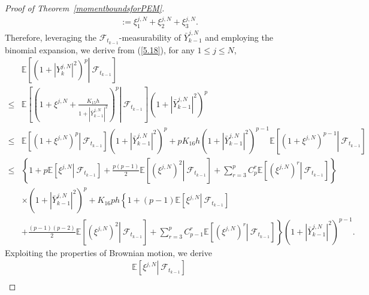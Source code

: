 \documentclass[12pt]{article}
\numberwithin{equation}{section}
\begin{document}
\begin{proof}[Proof of Theorem~\ref{momentboundsforPEM}]
\begin{equation}
\begin{aligned}
&:=\xi^{j,N}_1+\xi^{j,N}_2+\xi^{j,N}_3.
\end{aligned}
\end{equation}
Therefore, leveraging the $\mathcal{F}_{t_{k-1}}$-measurability of $\bar{Y}_{k-1}^{j,N}$ and employing the binomial expansion, we derive from (\ref{5.18}), for any $1 \leq j \leq N$,\\
\begin{equation}\tag{5.67}\label{5.20}
\begin{aligned}
&\mathbb{E} \left[\left. \left( 1+\left| Y_{k}^{j,N} \right|^2 \right) ^p\right\rvert\ \mathcal{F} _{t_{k-1}} \right]\\
\le &\mathbb{E} \left[\left. \left(1+\xi ^{j,N}+\tfrac{K_{15}h}{1+\left| \bar{Y}_{k-1}^{j,N} \right|^2}\right)^p\right\rvert\ \mathcal{F} _{t_{k-1}} \right] \left( 1+\left| \bar{Y}_{k-1}^{j,N} \right|^2 \right) ^p
\\
\le &\mathbb{E} \left[\left. \left(1+\xi ^{j,N}\right)^p\right\rvert\ \mathcal{F} _{t_{k-1}} \right] \left( 1+\left| \bar{Y}_{k-1}^{j,N} \right|^2 \right) ^p+pK_{16}h\left( 1+\left| \bar{Y}_{k-1}^{j,N} \right|^2 \right) ^{p-1}\mathbb{E}\left[\left. \left(1+\xi ^{j,N}\right)^{p-1}\right\rvert\ \mathcal{F} _{t_{k-1}} \right] 
\\
\le &\left\{1+p\mathbb{E}\left[\left. \xi^{j,N} \right\rvert\ \mathcal{F}_{t_{k-1}}\right]+\tfrac{p\left(p-1\right)}{2}\mathbb{E}\left[\left.\left(\xi^{j,N}\right)^2\right\rvert\ \mathcal{F}_{t_{k-1}}\right]+\sum_{r=3}^p{C_{p}^{r}\mathbb{E}\left[\left.\left(\xi^{j,N}\right)^r\right\rvert\ \mathcal{F}_{t_{k-1}}\right]}\right\}\\
&\times\left( 1+\left| \bar{Y}_{k-1}^{j,N} \right|^2 \right) ^p+K_{16}ph\left\{1+\left(p-1\right)\mathbb{E}\left[\left. \xi^{j,N} \right\rvert\ \mathcal{F}_{t_{k-1}}\right]\right.\\
&+\left.\tfrac{\left(p-1\right)\left(p-2\right)}{2}\mathbb{E}\left[\left.\left(\xi^{j,N}\right)^2\right\rvert\ \mathcal{F}_{t_{k-1}}\right]+\sum_{r=3}^p{C_{p-1}^{r}\mathbb{E}\left[\left.\left(\xi^{j,N}\right)^r\right\rvert\ \mathcal{F}_{t_{k-1}}\right]}\right\}\left( 1+\left| \bar{Y}_{k-1}^{j,N} \right|^2 \right) ^{p-1}.
\end{aligned}
\end{equation}
Exploiting the properties of Brownian motion, we derive
\begin{equation}\tag{5.68}\label{5.21}
\begin{aligned}
&\mathbb{E}\left[\left.\xi^{j,N} \right\rvert\ \mathcal{F}_{t_{k-1}}\right]\\

\end{aligned}
\end{equation}
\end{proof}
\end{document}
